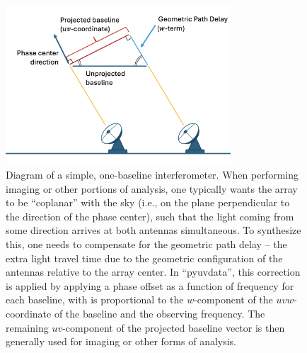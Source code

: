 \documentclass[11pt, oneside]{article}
\begin{document}
\begin{figure}[!t]
    \centering
    \includegraphics[width=0.75\textwidth]{simple_interferometer.png}
    \caption{Diagram of a simple, one-baseline interferometer. When performing imaging or other portions of analysis, one typically wants the array to be ``coplanar'' with the sky (i.e., on the plane perpendicular to the direction of the phase center), such that the light coming from some direction arrives at both antennas simultaneous. To synthesize this, one needs to compensate for the geometric path delay -- the extra light travel time due to the geometric configuration of the antennas relative to the array center. In ``pyuvdata'', this correction is applied by applying a phase offset as a function of frequency for each baseline, with is proportional to the $w$-component of the $uvw$-coordinate of the baseline and the observing frequency. The remaining $uv$-component of the projected baseline vector is then generally used for imaging or other forms of analysis.}
    \label{fig:simple_interferometer}
\end{figure}
\end{document}

